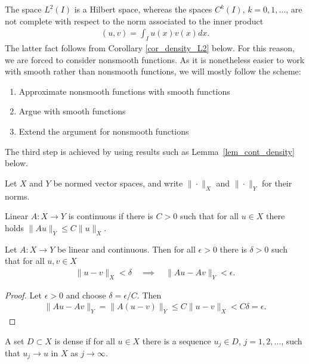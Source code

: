 \documentclass[12pt,oneside,final]{amsart}
\begin{document}
The space $L^2(I)$ is a Hilbert space, whereas 
the spaces $C^k(I)$, $k=0,1,\dots$, are not complete with respect to the norm associated to the inner product
    \begin{align*}
(u,v) = \int_I u(x)v(x)dx.
    \end{align*}
The latter fact follows from Corollary \ref{cor_density_L2} below.
For this reason, we are forced to consider nonsmooth functions.
As it is nonetheless easier to work with smooth rather than nonsmooth functions, we will mostly follow the scheme:
\begin{enumerate}[1. ]
\item Approximate nonsmooth functions with smooth functions
\item Argue with smooth functions
\item Extend the argument for nonsmooth functions 
\end{enumerate}
The third step is achieved by using results such as Lemma~\ref{lem_cont_density} below.

Let $X$ and $Y$ be normed vector spaces, and write $\|\cdot\|_X$ and $\|\cdot\|_Y$ for their norms.   

\begin{definition}\label{def_cont}
Linear $A : X \to Y$ is continuous if there is $C > 0$
such that for all $u \in X$ there holds 
$\|A u\|_Y \le C \|u\|_X$.
\end{definition}

\begin{remark}
Let $A : X \to Y$ be linear and continuous.
Then for all $\epsilon > 0$ there is $\delta > 0$ 
such that for all $u, v \in X$ 
    \begin{align*}
\|u-v\|_X < \delta \quad \implies \quad \|Au-Av\|_Y < \epsilon.
    \end{align*}
\end{remark}
\begin{proof}
Let $\epsilon > 0$ and choose $\delta = \epsilon / C$. 
Then
    \begin{align*}
\|Au-Av\|_Y = \|A(u-v)\|_Y \le C \|u-v\|_X < C \delta = \epsilon.
    \end{align*}
\end{proof}

\begin{definition}
A set $D \subset X$ is dense if for all $u \in X$ there is a sequence $u_j \in D$, $j=1,2,\dots$, such that $u_j \to u$ in $X$ as $j \to \infty$.
\end{definition}
\end{document}
